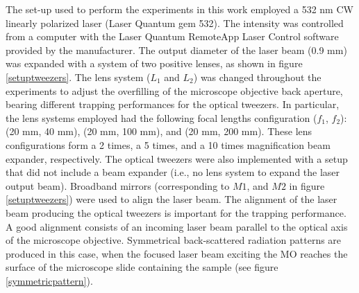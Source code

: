 \documentclass[letterpaper,12pt,oneside]{book}
\begin{document}
The set-up used to perform the experiments in this work employed a 532 nm CW linearly polarized laser (Laser Quantum gem 532). The intensity was controlled from a computer with the Laser Quantum RemoteApp Laser Control software provided by the manufacturer. The output diameter of the laser beam (0.9 mm) was expanded with a system of two positive lenses, as shown in figure \ref{setuptweezers}. The lens system ($L_1$ and $L_2$) was changed throughout the experiments to adjust the overfilling of the microscope objective back aperture, bearing different trapping performances for the optical tweezers. In particular, the lens systems employed had the following focal lengths configuration ($f_1$, $f_2$): (20 mm, 40 mm), (20 mm, 100 mm), and (20 mm, 200 mm). These lens configurations form a 2 times, a 5 times, and a 10 times magnification beam expander, respectively. The optical tweezers were also implemented with a setup that did not include a beam expander (i.e., no lens system to expand the laser output beam). Broadband mirrors (corresponding to $M1$, and $M2$ in figure \ref{setuptweezers}) were used to align the laser beam. The alignment of the laser beam producing the optical tweezers is important for the trapping performance. A good alignment consists of an incoming laser beam parallel to the optical axis of the microscope objective. 
Symmetrical back-scattered radiation patterns are produced in this case, when the focused laser beam exciting the MO reaches the surface of the microscope slide containing the sample (see figure \ref{symmetricpattern}). 
\end{document}
